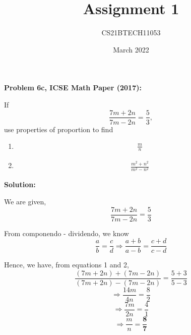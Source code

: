 \documentclass[12pt, journal, twocolumn]{IEEEtran}
\begin{document}
\title{Assignment 1}
\author{CS21BTECH11053}
\date{March 2022}
\maketitle
\raggedright                    %

\textbf{Problem 6c, ICSE Math Paper (2017):}
\vspace{5mm}

If \begin{equation*}\frac{7m + 2n}{7m - 2n} = \frac{5}{3},\end{equation*}use properties of proportion to find
\vspace{2mm}
\begin{enumerate}[label=(\roman{enumi})]
    \item \begin{equation*}\begin{split}&\frac{m}{n}\end{split}\end{equation*}
    \item \begin{equation*}\begin{split}&\frac{m^2 + n^2}{m^2 - n^2}\end{split}\end{equation*}
\end{enumerate}
\vspace{10mm}

\textbf{Solution: }

We are given,
\begin{equation}
\frac{7m + 2n}{7m - 2n} = \frac{5}{3}
\end{equation}
\vspace{3mm}

From componendo - dividendo, we know
\begin{equation}
\frac{a}{b} = \frac{c}{d} \Rightarrow \frac{a+b}{a-b} = \frac{c+d}{c-d}
\end{equation}
\vspace{3mm}

Hence, we have, from equations 1 and 2,
\begin{equation*}
\frac{(7m + 2n) + (7m - 2n)}{(7m + 2n) - (7m - 2n)} = \frac{5 + 3}{5 - 3}
\end{equation*}
\begin{equation*}
\Rightarrow \frac{14m}{4n} = \frac{8}{2}
\end{equation*}
\begin{equation*}
\Rightarrow \frac{7m}{2n} = \frac{4}{1}
\end{equation*}
\begin{equation}
\Rightarrow \frac{m}{n} = \frac{\textbf{8}}{\textbf{7}}
\end{equation}
\vspace{3mm}
\end{document}
